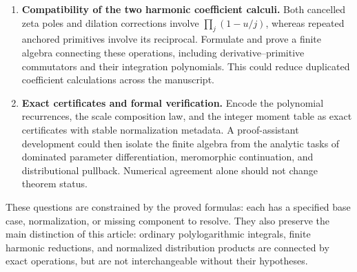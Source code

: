 \begin{enumerate}[label=\textbf{Q\arabic*.},leftmargin=2.7em]
\item \textbf{Compatibility of the two harmonic coefficient calculi.}
Both cancelled zeta poles and dilation corrections involve
$\prod_j(1-u/j)$, whereas repeated anchored primitives involve its
reciprocal. Formulate and prove a finite algebra connecting these
operations, including derivative--primitive commutators and their
integration polynomials. This could reduce duplicated coefficient
calculations across the manuscript.

\item \textbf{Exact certificates and formal verification.}
Encode the polynomial recurrences, the scale composition law, and the
integer moment table as exact certificates with stable normalization
metadata. A proof-assistant development could then isolate the finite
algebra from the analytic tasks of dominated parameter differentiation,
meromorphic continuation, and distributional pullback. Numerical
agreement alone should not change theorem status.
\end{enumerate}

These questions are constrained by the proved formulas: each has a
specified base case, normalization, or missing component to resolve.
They also preserve the main distinction of this article: ordinary
polylogarithmic integrals, finite harmonic reductions, and normalized
distribution products are connected by exact operations, but are not
interchangeable without their hypotheses.

